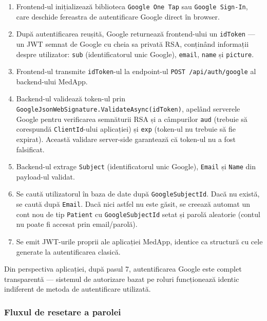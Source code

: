 \documentclass[12pt, a4paper]{report}
\begin{document}
\begin{enumerate}
    \item Frontend-ul inițializează biblioteca \texttt{Google One Tap} sau
          \texttt{Google Sign-In}, care deschide fereastra de autentificare Google
          direct în browser.
    \item După autentificarea reușită, Google returnează frontend-ului un
          \texttt{idToken} --- un JWT semnat de Google cu cheia sa privată RSA,
          conținând informații despre utilizator: \texttt{sub} (identificatorul
          unic Google), \texttt{email}, \texttt{name} și \texttt{picture}.
    \item Frontend-ul transmite \texttt{idToken}-ul la endpoint-ul
          \texttt{POST /api/auth/google} al backend-ului MedApp.
    \item Backend-ul validează token-ul prin
          \texttt{GoogleJsonWebSignature.ValidateAsync(idToken)}, apelând
          serverele Google pentru verificarea semnăturii RSA și a câmpurilor
          \texttt{aud} (trebuie să corespundă \texttt{ClientId}-ului aplicației)
          și \texttt{exp} (token-ul nu trebuie să fie expirat). Această validare
          server-side garantează că token-ul nu a fost falsificat.
    \item Backend-ul extrage \texttt{Subject} (identificatorul unic Google),
          \texttt{Email} și \texttt{Name} din payload-ul validat.
    \item Se caută utilizatorul în baza de date după \texttt{GoogleSubjectId}.
          Dacă nu există, se caută după \texttt{Email}. Dacă nici astfel nu este
          găsit, se creează automat un cont nou de tip \texttt{Patient} cu
          \texttt{GoogleSubjectId} setat și parolă aleatorie (contul nu poate fi
          accesat prin email/parolă).
    \item Se emit JWT-urile proprii ale aplicației MedApp, identice ca structură
          cu cele generate la autentificarea clasică.
\end{enumerate}

Din perspectiva aplicației, după pasul 7, autentificarea Google este complet
transparentă --- sistemul de autorizare bazat pe roluri funcționează identic
indiferent de metoda de autentificare utilizată.

\subsubsection{Fluxul de resetare a parolei}
\end{document}

